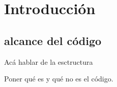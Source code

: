 




















\section{Introducción}

\subsection{alcance del código}
Acá hablar de la esctructura

Poner qué es y qué no es el código.


